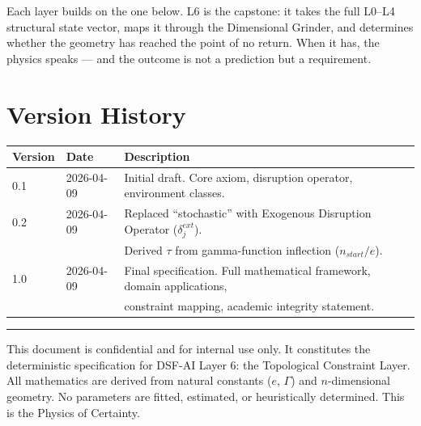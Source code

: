 \documentclass[11pt, a4paper]{article}
\begin{document}
Each layer builds on the one below. L6 is the capstone: it takes the
full L0--L4 structural state vector, maps it through the Dimensional
Grinder, and determines whether the geometry has reached the point of
no return. When it has, the physics speaks --- and the outcome is not
a prediction but a requirement.

\section{Version History}

\begin{center}
\begin{tabular}{@{}lll@{}}
\toprule
\textbf{Version} & \textbf{Date} & \textbf{Description} \\
\midrule
0.1 & 2026-04-09 & Initial draft. Core axiom, disruption operator, environment classes. \\
0.2 & 2026-04-09 & Replaced ``stochastic'' with Exogenous Disruption Operator ($\delta_j^{ext}$). \\
    &            & Derived $\tau$ from gamma-function inflection ($n_{start}/e$). \\
1.0 & 2026-04-09 & Final specification. Full mathematical framework, domain applications, \\
    &            & constraint mapping, academic integrity statement. \\
\bottomrule
\end{tabular}
\end{center}

\vspace{2em}
\hrule
\vspace{0.5em}
{\color{tfe-gray}\small This document is confidential and for internal use only.
It constitutes the deterministic specification for DSF-AI Layer 6: the
Topological Constraint Layer. All mathematics are derived from natural
constants ($e$, $\Gamma$) and $n$-dimensional geometry. No parameters
are fitted, estimated, or heuristically determined. This is the Physics
of Certainty.}
\end{document}
